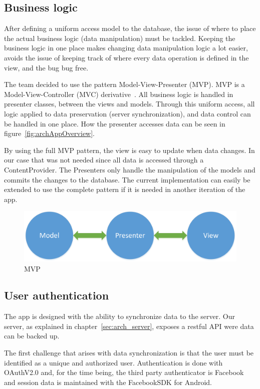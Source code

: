 \subsection{Business logic}
After defining a uniform access model to the database, the issue of where to place the actual business logic (data manipulation) must be tackled. Keeping the business logic in one place makes changing data manipulation logic a lot easier, avoids the issue of keeping track of where every data operation is defined in the view, and the bug bug free.

The team decided to use the pattern Model-View-Presenter (MVP). MVP is a Model-View-Controller (MVC) derivative~\cite{mvc}. All business logic is handled in presenter classes, between the views and models. Through this uniform access, all logic applied to data preservation (server synchronization), and data control can be handled in one place. How the presenter accesses data can be seen in figure~\ref{fig:archAppOverview}.

By using the full MVP pattern, the view is easy to update when data changes. In our case that was not needed since all data is accessed through a ContentProvider. The Presenters only handle the manipulation of the models and commits the changes to the database. The current implementation can easily be extended to use the complete pattern if it is needed in another iteration of the app.  

\begin{figure}[H]
\includegraphics[width=\textwidth]{ch/architecture/fig/mvp.png}
\caption{MVP}
\label{fig:mvp}
\end{figure}

\subsection{User authentication}
The app is designed with the ability to synchronize data to the server. Our server, as explained in chapter~\ref{sec:arch_server}, exposes a restful API were data can be backed up.

The first challenge that arises with data synchronization is that the user must be identified as a unique and authorized user. Authentication is done with OAuthV2.0 and, for the time being, the third party authenticator is Facebook and session data is maintained with the FacebookSDK for Android. 

